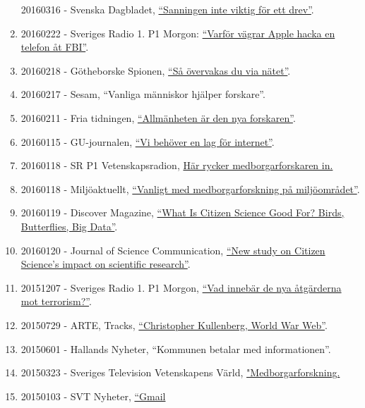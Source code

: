 \documentclass[
]{article}
\begin{document}
\begin{enumerate}
  20160316 - Svenska Dagbladet,
  \href{http://www.svd.se/sanning-inte-viktigt-for-ett-drev/om/natdrev}{``Sanningen
  inte viktig för ett drev''}.
\item
  20160222 - Sveriges Radio 1. P1 Morgon:
  \href{http://t.sr.se/1KBHSak}{``Varför vägrar Apple hacka en telefon
  åt FBI''}.
\item
  20160218 - Götheborske Spionen,
  \href{http://www.spionen.se/140-redaktionellt/reportage/feature/1593-sa-oevervakas-du-via-naetet}{``Så
  övervakas du via nätet''}.
\item
  20160217 - Sesam, ``Vanliga människor hjälper forskare''.
\item
  20160211 - Fria tidningen,
  \href{http://www.fria.nu/artikel/121724}{``Allmänheten är den nya
  forskaren''}.
\item
  20160115 - GU-journalen,
  \href{https://issuu.com/universityofgothenburg/docs/guj1-2016/32}{``Vi
  behöver en lag för internet''}.
\item
  20160118 - SR P1 Vetenskapsradion, \href{http://t.sr.se/239vggG}{Här
  rycker medborgarforskaren in.}
\item
  20160118 - Miljöaktuellt,
  \href{http://miljoaktuellt.se/vanligare-att-forskare-tar-hjalp-av-allmanheten/}{``Vanligt
  med medborgarforskning på miljöområdet''}.
\item
  20160119 - Discover Magazine,
  \href{http://blogs.discovermagazine.com/inkfish/2016/01/19/what-is-citizen-science-good-for-birds-butterflies-big-data/\#.Vp9DvPGFB24}{``What
  Is Citizen Science Good For? Birds, Butterflies, Big Data''}.
\item
  20160120 - Journal of Science Communication,
  \href{http://jcom.sissa.it/node/3076}{``New study on Citizen Science's
  impact on scientific research''}.
\item
  20151207 - Sveriges Radio 1. P1 Morgon,
  \href{http://t.sr.se/1XMYemi}{``Vad innebär de nya åtgärderna mot
  terrorism?''}.
\item
  20150729 - ARTE, Tracks,
  \href{http://tracks.arte.tv/fr/christopher-kullenberg-world-war-web}{``Christopher
  Kullenberg, World War Web''}.
\item
  20150601 - Hallands Nyheter, ``Kommunen betalar med informationen''.
\item
  20150323 - Sveriges Television Vetenskapens Värld,
  \href{https://youtu.be/vG8sZQnU7mU?t=18m1s}{"Medborgarforskning.}
\item
  20150103 - SVT Nyheter,
  \href{http://www.svt.se/nyheter/utrikes/gmail-senaste-malet-for-kinas-natcensur?cmpid=del:pd:ny:20160803:gmail-senaste-malet-for-kinas-natcensur:nyh}{``Gmail
}
\end{enumerate}
\end{document}
